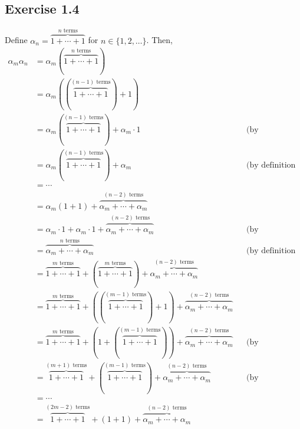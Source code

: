\documentclass{article}
\begin{document}
\let\rem\undefined
\let\Zm\undefined

\subsection{Exercise 1.4}
\newcommand\F{\mathfrak F}
Define $\alpha_n = \overbrace{1 + \cdots + 1}^\text{$n$ terms}$ for $n \in \{1, 2, \ldots\}$.
Then, \begin{align*}
  \alpha_m\alpha_n
  &= \alpha_m(\overbrace{1 + \dotsb + 1}^\text{$n$ terms}) \\
  &= \alpha_m((\overbrace{1+ \dotsb + 1}^\text{$(n-1)$ terms}) + 1)\\
  &= \alpha_m(\overbrace{1 + \dotsb + 1}^\text{$(n-1)$ terms}) + \alpha_m \cdot 1 && \text{(by distributive law)}\\
  &= \alpha_m(\overbrace{1 + \dotsb + 1}^\text{$(n-1)$ terms}) + \alpha_m && \text{(by definition of multiplicative identity)}\\
  &= \dotsb \\
  &= \alpha_m(1 + 1) + \overbrace{\alpha_m + \dotsb + \alpha_m}^\text{$(n-2)$ terms}\\
  &= \alpha_m \cdot 1 + \alpha_m \cdot 1 + \overbrace{\alpha_m + \dotsb + \alpha_m}^\text{$(n-2)$ terms} && \text{(by distributive law)} \\
  &= \overbrace{\alpha_m + \dotsb + \alpha_m}^\text{$n$ terms} && \text{(by definition of multiplicative identity)} \\
  &= \overbrace{1 + \dotsb + 1}^\text{$m$ terms} + (\overbrace{1 + \dotsb + 1}^\text{$m$ terms}) + \overbrace{\alpha_m + \dotsb + \alpha_m}^\text{$(n-2)$ terms} \\
  &= \overbrace{1 + \dotsb + 1}^\text{$m$ terms} + ((\overbrace{1 + \dotsb + 1}^\text{$(m-1)$ terms}) + 1) + \overbrace{\alpha_m + \dotsb + \alpha_m}^\text{$(n-2)$ terms} \\
  &= \overbrace{1 + \dotsb + 1}^\text{$m$ terms} + (1 + (\overbrace{1 + \dotsb + 1}^\text{$(m-1)$ terms})) + \overbrace{\alpha_m + \dotsb + \alpha_m}^\text{$(n-2)$ terms} && \text{(by commutative property)}\\
  &= \overbrace{1 + \dotsb + 1}^\text{$(m+1)$ terms} + (\overbrace{1 + \dotsb + 1}^\text{$(m-1)$ terms}) + \overbrace{\alpha_m + \dotsb + \alpha_m}^\text{$(n-2)$ terms} && \text{(by associative property)}  \\
  &= \dotsb \\
  &= \overbrace{1 + \dotsb + 1}^\text{$(2m-2)$ terms} + (1 + 1) + \overbrace{\alpha_m + \dotsb + \alpha_m}^\text{$(n-2)$ terms} \\

\end{align*}
\end{document}

